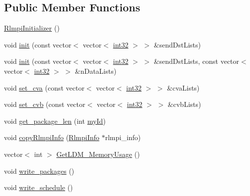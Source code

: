 \subsection*{Public Member Functions}
\begin{DoxyCompactItemize}
\item 
\mbox{\hyperlink{classRlmpiInitializer_a658d6a4ceeadcc2101eea81790fe02a9}{Rlmpi\+Initializer}} ()
\item 
void \mbox{\hyperlink{classRlmpiInitializer_ac6e0829290daa590b36ef4cb7df852f0}{init}} (const vector$<$ vector$<$ \mbox{\hyperlink{include_2RlmpiShared_8h_a56f1a81c92849566ae864511088eb7e8}{int32}} $>$ $>$ \&send\+Dst\+Lists)
\item 
void \mbox{\hyperlink{classRlmpiInitializer_ad23febf3d25fd76c52e2488d00b0ba09}{init}} (const vector$<$ vector$<$ \mbox{\hyperlink{include_2RlmpiShared_8h_a56f1a81c92849566ae864511088eb7e8}{int32}} $>$ $>$ \&send\+Dst\+Lists, const vector$<$ vector$<$ \mbox{\hyperlink{include_2RlmpiShared_8h_a56f1a81c92849566ae864511088eb7e8}{int32}} $>$ $>$ \&n\+Data\+Lists)
\item 
void \mbox{\hyperlink{classRlmpiInitializer_a8473df40ea79d01a8c6fcc1b7c8821ba}{set\+\_\+cva}} (const vector$<$ vector$<$ \mbox{\hyperlink{include_2RlmpiShared_8h_a56f1a81c92849566ae864511088eb7e8}{int32}} $>$ $>$ \&cva\+Lists)
\item 
void \mbox{\hyperlink{classRlmpiInitializer_a5b19bad74e8bdd02208de813906e86ca}{set\+\_\+cvb}} (const vector$<$ vector$<$ \mbox{\hyperlink{include_2RlmpiShared_8h_a56f1a81c92849566ae864511088eb7e8}{int32}} $>$ $>$ \&cvb\+Lists)
\item 
void \mbox{\hyperlink{classRlmpiInitializer_af4a1204487b7792e57a9731187ba050b}{get\+\_\+package\+\_\+len}} (int \mbox{\hyperlink{test_2directSegment_2directSegmentIterator__slave_8c_aeaf12029768109487cb0540ba258af5a}{my\+Id}})
\item 
void \mbox{\hyperlink{classRlmpiInitializer_ad8f197f08ce0145b6fda9a2b973b615a}{copy\+Rlmpi\+Info}} (\mbox{\hyperlink{structRlmpiInfo}{Rlmpi\+Info}} $\ast$rlmpi\+\_\+info)
\item 
vector$<$ int $>$ \mbox{\hyperlink{classRlmpiInitializer_a91c9d7864b9d83d218b06738f777a1e4}{Get\+L\+D\+M\+\_\+\+Memory\+Usage}} ()
\item 
void \mbox{\hyperlink{classRlmpiInitializer_a1d5c7addc4a0d39152ac81ebec7726bb}{write\+\_\+packages}} ()
\item 
void \mbox{\hyperlink{classRlmpiInitializer_a97d48ddb124af75c09509e63cc327246}{write\+\_\+schedule}} ()

\end{DoxyCompactItemize}
